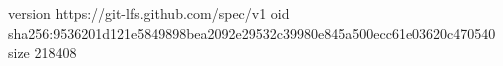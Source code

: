 version https://git-lfs.github.com/spec/v1
oid sha256:9536201d121e5849898bea2092e29532c39980e845a500ecc61e03620c470540
size 218408
